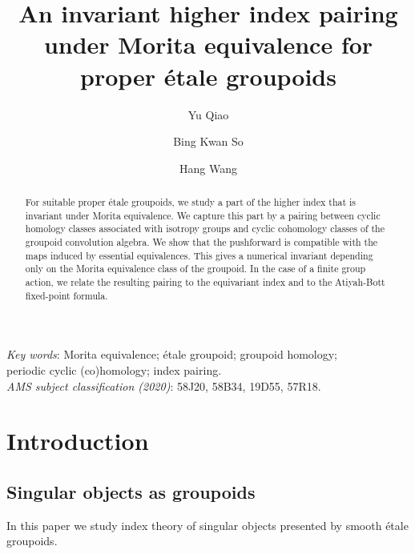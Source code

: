 \documentclass[a4paper]{amsart}
\author[Yu Qiao]{Yu Qiao}
\author[Bing Kwan So]{Bing Kwan So}
\author[Hang Wang]{Hang Wang}
\title[An Invariant higher index pairing]{An invariant higher index pairing under Morita equivalence for proper \'etale groupoids}
\newcommand\<{\langle}
\renewcommand\>{\rangle}
\theoremstyle{definition}
\theoremstyle{remark}
\begin{document}
\maketitle

\begin{abstract}
For suitable proper \'etale groupoids, we study a part of the higher index that is invariant under Morita equivalence.
We capture this part by a pairing between cyclic homology classes associated with isotropy groups
and cyclic cohomology classes of the groupoid convolution algebra.
We show that the pushforward is compatible with the maps induced by essential equivalences.
This gives a numerical invariant depending only on the Morita equivalence class of the groupoid.
In the case of a finite group action,
we relate the resulting pairing to the equivariant index and to the Atiyah-Bott fixed-point formula.

\end{abstract}

\begin{small}
\hspace*{0.72cm}
\textit{Key words}:
Morita equivalence; \'etale groupoid; groupoid homology;  \\
\hspace*{2.8cm}
periodic cyclic (co)homology; index pairing. \\
\hspace*{1.1cm}
\textit{AMS subject classification (2020)}: 58J20, 58B34, 19D55, 57R18.
\end{small}

\tableofcontents


\section{Introduction}

\subsection{Singular objects as groupoids}
In this paper we study index theory of singular objects presented by smooth \'etale groupoids.
\end{document}
